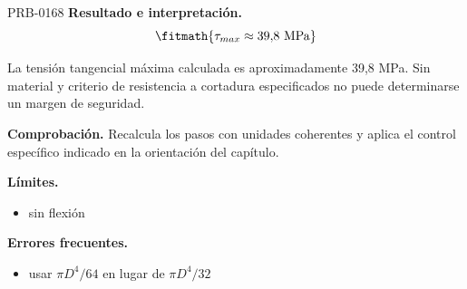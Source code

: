 \begin{studiumworked}{PRB-0168}
\textbf{Resultado e interpretación.}\[\fitmath{\tau_{max} \approx 39{,}8\ \mathrm{MPa}}\]

La tensión tangencial máxima calculada es aproximadamente 39,8 MPa. Sin material y criterio de resistencia a cortadura especificados no puede determinarse un margen de seguridad.

\par\textbf{Comprobación.} Recalcula los pasos con unidades coherentes y aplica el control específico indicado en la orientación del capítulo.

\textbf{Límites.}\begin{itemize}\item sin flexión\end{itemize}

\textbf{Errores frecuentes.}\begin{itemize}\item usar $\pi D^4/64$ en lugar de $\pi D^4/32$\end{itemize}

\end{studiumworked}

\Needspace{.3\textheight}

